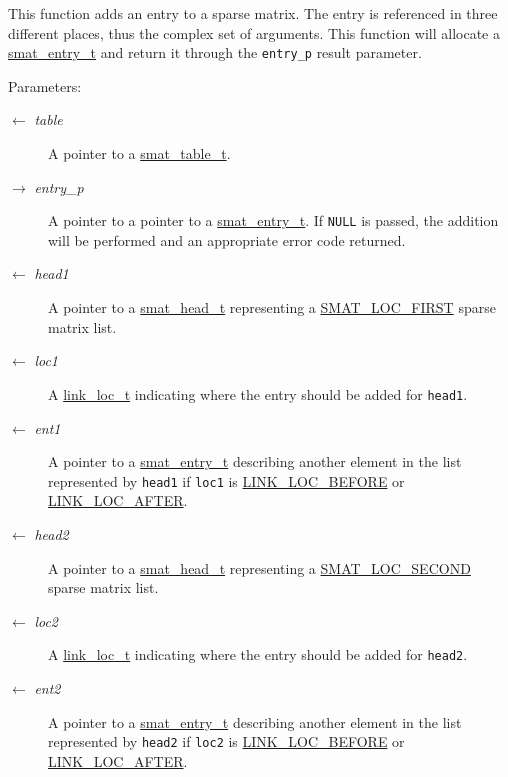 This function adds an entry to a sparse matrix. The entry is referenced in three different places, thus the complex set of arguments. This function will allocate a \hyperlink{group__dbprim__smat_ga2}{smat\_\-entry\_\-t} and return it through the {\tt entry\_\-p} result parameter.

\begin{Desc}
\item[Parameters:]
\begin{description}
\item[\mbox{$\leftarrow$} {\em table}]A pointer to a \hyperlink{group__dbprim__smat_ga0}{smat\_\-table\_\-t}. \item[\mbox{$\rightarrow$} {\em entry\_\-p}]A pointer to a pointer to a \hyperlink{group__dbprim__smat_ga2}{smat\_\-entry\_\-t}. If {\tt NULL} is passed, the addition will be performed and an appropriate error code returned. \item[\mbox{$\leftarrow$} {\em head1}]A pointer to a \hyperlink{group__dbprim__smat_ga1}{smat\_\-head\_\-t} representing a \hyperlink{group__dbprim__smat_gga70a137}{SMAT\_\-LOC\_\-FIRST} sparse matrix list. \item[\mbox{$\leftarrow$} {\em loc1}]A \hyperlink{group__dbprim__link_ga4}{link\_\-loc\_\-t} indicating where the entry should be added for {\tt head1}. \item[\mbox{$\leftarrow$} {\em ent1}]A pointer to a \hyperlink{group__dbprim__smat_ga2}{smat\_\-entry\_\-t} describing another element in the list represented by {\tt head1} if {\tt loc1} is \hyperlink{group__dbprim__link_gga28a135}{LINK\_\-LOC\_\-BEFORE} or \hyperlink{group__dbprim__link_gga28a136}{LINK\_\-LOC\_\-AFTER}. \item[\mbox{$\leftarrow$} {\em head2}]A pointer to a \hyperlink{group__dbprim__smat_ga1}{smat\_\-head\_\-t} representing a \hyperlink{group__dbprim__smat_gga70a138}{SMAT\_\-LOC\_\-SECOND} sparse matrix list. \item[\mbox{$\leftarrow$} {\em loc2}]A \hyperlink{group__dbprim__link_ga4}{link\_\-loc\_\-t} indicating where the entry should be added for {\tt head2}. \item[\mbox{$\leftarrow$} {\em ent2}]A pointer to a \hyperlink{group__dbprim__smat_ga2}{smat\_\-entry\_\-t} describing another element in the list represented by {\tt head2} if {\tt loc2} is \hyperlink{group__dbprim__link_gga28a135}{LINK\_\-LOC\_\-BEFORE} or \hyperlink{group__dbprim__link_gga28a136}{LINK\_\-LOC\_\-AFTER}.\end{description}
\end{Desc}
